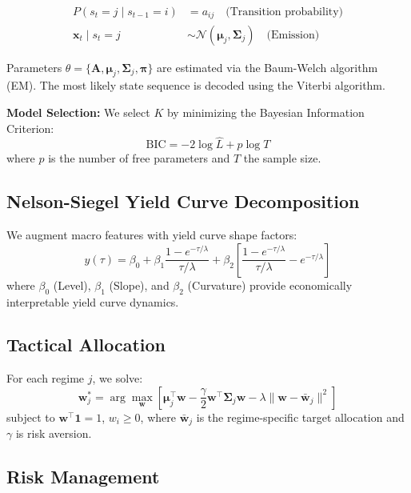 \documentclass[12pt, a4paper]{article}
\begin{document}
\begin{align}
    P(s_t = j \mid s_{t-1} = i) &= a_{ij} \quad \text{(Transition probability)} \\
    \mathbf{x}_t \mid s_t = j &\sim \mathcal{N}(\boldsymbol{\mu}_j, \boldsymbol{\Sigma}_j) \quad \text{(Emission)}
\end{align}

Parameters $\theta = \{\mathbf{A}, \boldsymbol{\mu}_j, \boldsymbol{\Sigma}_j, \boldsymbol{\pi}\}$
are estimated via the Baum-Welch algorithm (EM). The most likely state sequence
is decoded using the Viterbi algorithm.

\textbf{Model Selection:} We select $K$ by minimizing the Bayesian Information
Criterion:
\begin{equation}
    \text{BIC} = -2 \log \hat{L} + p \log T
\end{equation}
where $p$ is the number of free parameters and $T$ the sample size.

\subsection{Nelson-Siegel Yield Curve Decomposition}

We augment macro features with yield curve shape factors:
\begin{equation}
    y(\tau) = \beta_0 + \beta_1 \frac{1 - e^{-\tau/\lambda}}{\tau/\lambda}
    + \beta_2 \left[\frac{1 - e^{-\tau/\lambda}}{\tau/\lambda} - e^{-\tau/\lambda}\right]
\end{equation}
where $\beta_0$ (Level), $\beta_1$ (Slope), and $\beta_2$ (Curvature) provide
economically interpretable yield curve dynamics.

\subsection{Tactical Allocation}

For each regime $j$, we solve:
\begin{equation}
    \mathbf{w}_j^* = \arg\max_{\mathbf{w}} \left[
        \boldsymbol{\mu}_j^\top \mathbf{w}
        - \frac{\gamma}{2} \mathbf{w}^\top \boldsymbol{\Sigma}_j \mathbf{w}
        - \lambda \|\mathbf{w} - \bar{\mathbf{w}}_j\|^2
    \right]
\end{equation}
subject to $\mathbf{w}^\top \mathbf{1} = 1$, $w_i \geq 0$, where
$\bar{\mathbf{w}}_j$ is the regime-specific target allocation and $\gamma$ is
risk aversion.

\subsection{Risk Management}
\end{document}
